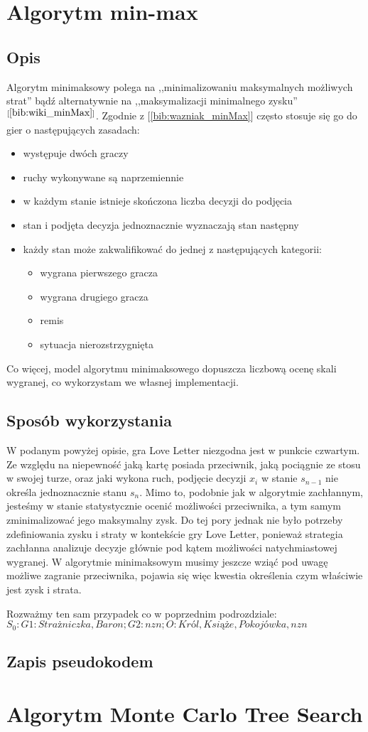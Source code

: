 \section{Algorytm min-max}
\label{sec:minmax}
\subsection{Opis}
Algorytm minimaksowy polega na ,,minimalizowaniu maksymalnych możliwych strat'' bądź alternatywnie na ,,maksymalizacji minimalnego zysku''$^{[\ref{bib:wiki_minMax}]}$. Zgodnie z [\ref{bib:wazniak_minMax}] często stosuje się go do gier o następujących zasadach:
\begin{itemize}
	\item występuje dwóch graczy
	\item ruchy wykonywane są naprzemiennie
	\item w każdym stanie istnieje skończona liczba decyzji do podjęcia
	\item stan i podjęta decyzja jednoznacznie wyznaczają stan następny
	\item każdy stan może zakwalifikować do jednej z następujących kategorii:
	\begin{itemize}
		\item wygrana pierwszego gracza
		\item wygrana drugiego gracza
		\item remis
		\item sytuacja nierozstrzygnięta
	\end{itemize}
\end{itemize}
Co więcej, model algorytmu minimaksowego dopuszcza liczbową ocenę skali wygranej, co wykorzystam we własnej implementacji.

\subsection{Sposób wykorzystania}
W podanym powyżej opisie, gra Love Letter niezgodna jest w punkcie czwartym. Ze względu na niepewność jaką kartę posiada przeciwnik, jaką pociągnie ze stosu w swojej turze, oraz jaki wykona ruch, podjęcie decyzji $x_i$ w stanie $s_{n-1}$ nie określa jednoznacznie stanu $s_n$. Mimo to, podobnie jak w algorytmie zachłannym, jesteśmy w stanie statystycznie ocenić możliwości przeciwnika, a tym samym zminimalizować jego maksymalny zysk. Do tej pory jednak nie było potrzeby zdefiniowania zysku i straty w kontekście gry Love Letter, ponieważ strategia zachłanna analizuje decyzje głównie pod kątem możliwości natychmiastowej wygranej. W algorytmie minimaksowym musimy jeszcze wziąć pod uwagę możliwe zagranie przeciwnika, pojawia się więc kwestia określenia czym właściwie jest zysk i strata.

Rozważmy ten sam przypadek co w poprzednim podrozdziale:
$S_0: {G1:Strażniczka, Baron ; G2:nzn ; O: Król, Książe, Pokojówka, nzn} $

\subsection{Zapis pseudokodem}

\section{Algorytm Monte Carlo Tree Search}
\label{sec:algMCTS}